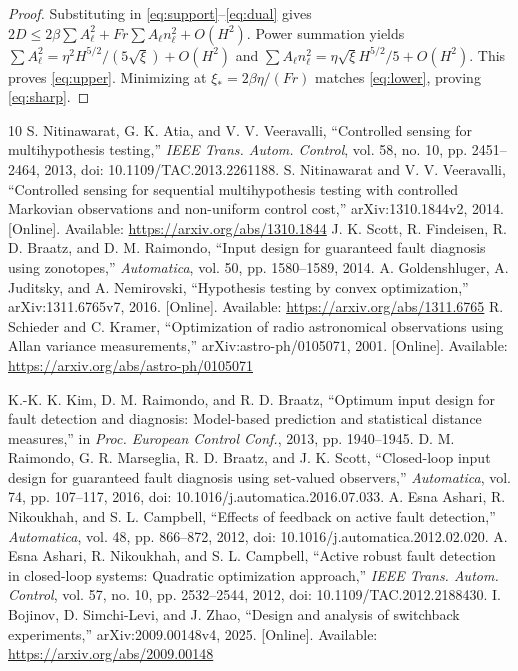 \documentclass[11pt]{article}
\begin{document}
\begin{proof}
Substituting in \eqref{eq:support}--\eqref{eq:dual} gives
$2D\le2\beta\sum A_\ell^2+Fr\sum A_\ell n_\ell^2+O(H^2)$.
Power summation yields
$\sum A_\ell^2=\eta^2H^{5/2}/(5\sqrt\xi)+O(H^2)$ and
$\sum A_\ell n_\ell^2=\eta\sqrt\xi H^{5/2}/5+O(H^2)$.
This proves \eqref{eq:upper}. Minimizing at
$\xi_*=2\beta\eta/(Fr)$ matches \eqref{eq:lower}, proving \eqref{eq:sharp}.
\end{proof}

\begin{thebibliography}{10}
S. Nitinawarat, G. K. Atia, and V. V. Veeravalli,
``Controlled sensing for multihypothesis testing,''
\emph{IEEE Trans. Autom. Control}, vol. 58, no. 10, pp. 2451--2464, 2013,
doi: 10.1109/TAC.2013.2261188.
S. Nitinawarat and V. V. Veeravalli,
``Controlled sensing for sequential multihypothesis testing with controlled
Markovian observations and non-uniform control cost,''
arXiv:1310.1844v2, 2014. [Online]. Available: \url{https://arxiv.org/abs/1310.1844}
J. K. Scott, R. Findeisen, R. D. Braatz, and D. M. Raimondo,
``Input design for guaranteed fault diagnosis using zonotopes,''
\emph{Automatica}, vol. 50, pp. 1580--1589, 2014.
A. Goldenshluger, A. Juditsky, and A. Nemirovski,
``Hypothesis testing by convex optimization,'' arXiv:1311.6765v7, 2016.
[Online]. Available: \url{https://arxiv.org/abs/1311.6765}
R. Schieder and C. Kramer,
``Optimization of radio astronomical observations using Allan variance measurements,''
arXiv:astro-ph/0105071, 2001.
[Online]. Available: \url{https://arxiv.org/abs/astro-ph/0105071}

K.-K. K. Kim, D. M. Raimondo, and R. D. Braatz,
``Optimum input design for fault detection and diagnosis: Model-based prediction
and statistical distance measures,'' in \emph{Proc. European Control Conf.},
2013, pp. 1940--1945.
D. M. Raimondo, G. R. Marseglia, R. D. Braatz, and J. K. Scott,
``Closed-loop input design for guaranteed fault diagnosis using set-valued
observers,'' \emph{Automatica}, vol. 74, pp. 107--117, 2016,
doi: 10.1016/j.automatica.2016.07.033.
A. Esna Ashari, R. Nikoukhah, and S. L. Campbell,
``Effects of feedback on active fault detection,'' \emph{Automatica},
vol. 48, pp. 866--872, 2012, doi: 10.1016/j.automatica.2012.02.020.
A. Esna Ashari, R. Nikoukhah, and S. L. Campbell,
``Active robust fault detection in closed-loop systems: Quadratic optimization
approach,'' \emph{IEEE Trans. Autom. Control}, vol. 57, no. 10,
pp. 2532--2544, 2012, doi: 10.1109/TAC.2012.2188430.
I. Bojinov, D. Simchi-Levi, and J. Zhao,
``Design and analysis of switchback experiments,'' arXiv:2009.00148v4, 2025.
[Online]. Available: \url{https://arxiv.org/abs/2009.00148}

\end{thebibliography}
\end{document}
